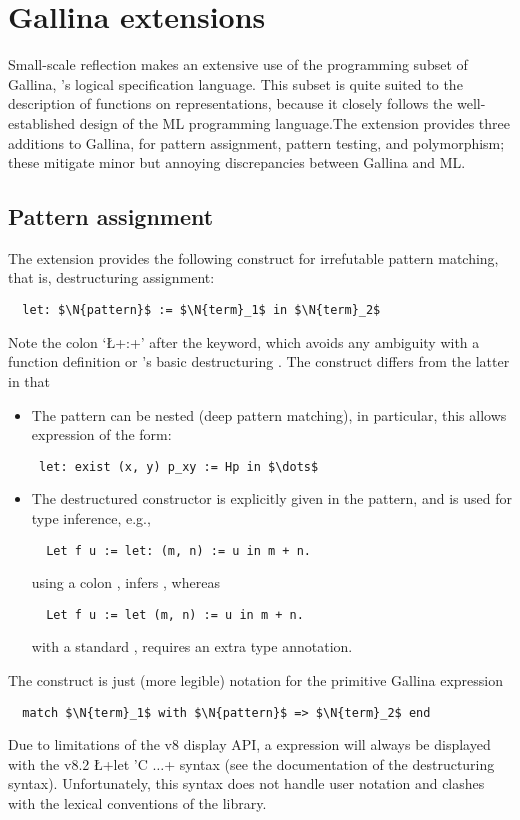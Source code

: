\section{Gallina extensions}

Small-scale reflection makes an extensive use of the programming
subset of Gallina, \Coq{}'s logical specification language. This subset
is quite suited to the description of functions on representations,
because it closely follows the well-established design of the ML
programming language.The \ssr{} extension provides three additions
to Gallina, for pattern assignment, pattern testing, and polymorphism;
these mitigate minor but annoying discrepancies between Gallina and ML.

\subsection{Pattern assignment}\label{ssec:patass}
The \ssr{} extension provides the following construct for
irrefutable pattern matching, that is, destructuring assignment:
\begin{lstlisting}
  let: $\N{pattern}$ := $\N{term}_1$ in $\N{term}_2$
\end{lstlisting}
Note the colon `\L+:+' after the  keyword, which avoids any
ambiguity with a function
definition or \Coq{}'s basic destructuring . The 
construct differs from the latter in that
\begin{itemize}
\item The pattern can be nested (deep pattern matching), in
  particular, this allows expression of the form:
\begin{lstlisting}
 let: exist (x, y) p_xy := Hp in $\dots$
\end{lstlisting}
\item The destructured constructor is explicitly given in the
  pattern, and is used for type inference, e.g.,
\begin{lstlisting}
  Let f u := let: (m, n) := u in m + n.
\end{lstlisting}
using a colon , infers , whereas
\begin{lstlisting}
  Let f u := let (m, n) := u in m + n.
\end{lstlisting}
with a standard , requires an extra type annotation.
\end{itemize}
The  construct is just (more legible) notation for the primitive Gallina expression
\begin{lstlisting}
  match $\N{term}_1$ with $\N{pattern}$ => $\N{term}_2$ end
\end{lstlisting}
Due to limitations of the \Coq{} v8 display API, a  expression
will always be displayed with the \Coq{} v8.2 \L+let 'C $\dots$+ syntax
(see the \Coq{} documentation of the destructuring 
syntax). Unfortunately, this syntax does not handle user notation and
clashes with the lexical conventions of the \ssr{} library.

